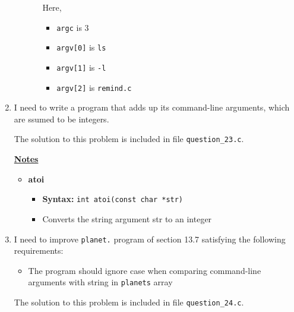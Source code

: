 \documentclass[12pt]{article}
\begin{document}
\begin{enumerate}[1.]
\begin{itemize}
\begin{itemize}
            \bigskip

            Here,

            \begin{itemize}
                \item \texttt{argc} is 3
                \item \texttt{argv[0]} is \texttt{ls}
                \item \texttt{argv[1]} is \texttt{-l}
                \item \texttt{argv[2]} is \texttt{remind.c}
            \end{itemize}
        \end{itemize}
    \end{itemize}

    \item

    I need to write a program that adds up its command-line arguments, which are ssumed to be integers.

    \bigskip

    The solution to this problem is included in file \texttt{question\_23.c}.

    \bigskip

    \underline{\textbf{Notes}}

    \begin{itemize}
        \item \textbf{atoi}
        \begin{itemize}
            \item \textbf{Syntax:} \texttt{int atoi(const char *str)}
            \item Converts the string argument str to an integer
        \end{itemize}
    \end{itemize}

    \item

    I need to improve \texttt{planet.} program of section 13.7 satisfying the following
    requirements:

    \begin{itemize}
        \item The program should ignore case when comparing command-line arguments with string in \texttt{planets} array
    \end{itemize}

    \bigskip

    The solution to this problem is included in file \texttt{question\_24.c}.


\end{enumerate}
\end{document}
